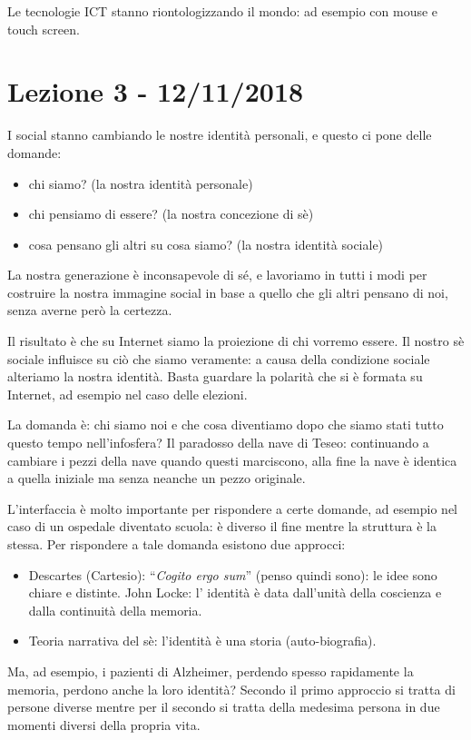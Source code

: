 \documentclass[a4page, 11pt]{article}
\begin{document}
Le tecnologie ICT stanno riontologizzando il mondo: ad esempio con mouse e touch screen.


\section*{Lezione 3 - 12/11/2018}
I social stanno cambiando le nostre identità personali, e questo ci pone delle domande:
\begin{itemize}
  \item chi siamo? (la nostra identità personale)
  \item chi pensiamo di essere? (la nostra concezione di sè)
  \item cosa pensano gli altri su cosa siamo? (la nostra identità sociale)
\end{itemize}

La nostra generazione è inconsapevole di sé, e lavoriamo in tutti i modi per costruire la nostra immagine social in base a quello che gli altri pensano di noi, senza averne però la certezza.

Il risultato è che su Internet siamo la proiezione di chi vorremo essere.
Il nostro sè sociale influisce su ciò che siamo veramente: a causa della condizione sociale alteriamo la nostra identità.
Basta guardare la polarità che si è formata su Internet, ad esempio nel caso delle elezioni.

La domanda è: chi siamo noi e che cosa diventiamo dopo che siamo stati tutto questo tempo nell'infosfera?
Il paradosso della nave di Teseo: continuando a cambiare i pezzi della nave quando questi marciscono, alla fine la nave è identica a quella iniziale ma senza neanche un pezzo originale.

L'interfaccia è molto importante per rispondere a certe domande, ad esempio nel caso di un ospedale diventato scuola: è diverso il fine  mentre la struttura è la stessa.
Per rispondere a tale domanda esistono due approcci:
\begin{itemize}
  \item Descartes (Cartesio): ``\textit{Cogito ergo sum}'' (penso quindi sono): le idee sono chiare e distinte. John Locke: l' identità è data dall'unità della coscienza e dalla continuità della memoria.
  \item Teoria narrativa del sè: l'identità è una storia (auto-biografia).
\end{itemize}

Ma, ad esempio, i pazienti di Alzheimer, perdendo spesso rapidamente la memoria, perdono anche la loro identità?
Secondo il primo approccio si tratta di persone diverse mentre per il secondo si tratta della medesima persona in due momenti diversi della propria vita.
\end{document}
